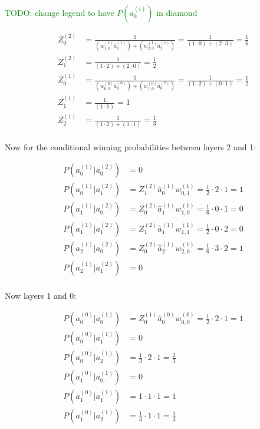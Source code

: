 \documentclass[A4paper,draft]{scrreprt}
\newcommand{\neuron}[2]{a_{#2}^{(#1)}}
\newcommand{\neuronforward}[2]{\hat{a}_{#2}^{(#1)}}
\newcommand{\ebpscalar}[2]{Z_{#2}^{(#1)}}
\newcommand{\weight}[3]{w_{#2,#3}^{(#1)}}
\newcommand{\cwp}[4]{P\left(\neuron{#1}{#2} | \neuron{#3}{#4}\right)}
\begin{document}
\textcolor{green}{TODO: change legend to have $P(a_k^{(i)})$ in diamond}\newline

\begin{align*}
\ebpscalar{2}{0} &=
  \frac{1}{\left(\weight{1}{1}{0}\neuronforward{1}{1}\right) +
  \left(\weight{1}{2}{0} \neuronforward{1}{2}\right)}
  = \frac{1}{(1 \cdot 0) + (2 \cdot 3)}
  = \frac{1}{6}
  \\
\ebpscalar{2}{1} &= \frac{1}{(1\cdot 2) + (2 \cdot 0)} = \frac{1}{2}\\
\ebpscalar{1}{0} &= \frac{1}{
  \left(\weight{0}{0}{0} \neuronforward{0}{0}\right) +
  \left(\weight{0}{1}{0} \neuronforward{0}{0}\right)}
  = \frac{1}{(1 \cdot 2) + (0 \cdot 1)}
  = \frac{1}{2}
  \\
\ebpscalar{1}{1} &= \frac{1}{(1 \cdot 1)} = 1\\
\ebpscalar{1}{2} &= \frac{1}{(1 \cdot 2) + (1 \cdot 1)} = \frac{1}{3}\\
\end{align*}

Now for the conditional winning probabilities between layers 2 and 1:

\begin{align*}
\cwp{1}{0}{2}{0} &= 0 \\
\cwp{1}{0}{2}{1} &= \ebpscalar{2}{1} \neuronforward{1}{0} \weight{1}{0}{1} =
  \frac{1}{2} \cdot 2 \cdot 1 = 1
  \\
\cwp{1}{1}{2}{0} &= \ebpscalar{2}{0} \neuronforward{1}{1} \weight{1}{1}{0} =
  \frac{1}{6} \cdot 0 \cdot 1 = 0
  \\
\cwp{1}{1}{2}{1} &= \ebpscalar{2}{1} \neuronforward{1}{1} \weight{1}{1}{1} =
  \frac{1}{2} \cdot 0 \cdot 2 = 0
  \\
\cwp{1}{2}{2}{0} &= \ebpscalar{2}{0} \neuronforward{1}{2} \weight{1}{2}{0} =
  \frac{1}{6} \cdot 3 \cdot 2 = 1
  \\
\cwp{1}{2}{2}{1} &= 0\\
\end{align*}

Now layers 1 and 0:

\begin{align*}
\cwp{0}{0}{1}{0} &= \ebpscalar{1}{0} \neuronforward{0}{0} \weight{0}{0}{0} =
  \frac{1}{2} \cdot 2 \cdot 1 = 1\\
\cwp{0}{0}{1}{1} &= 0 \\
\cwp{0}{0}{1}{2} &= \frac{1}{3} \cdot 2 \cdot 1 = \frac{2}{3} \\
\cwp{0}{1}{1}{0} &= 0 \\
\cwp{0}{1}{1}{1} &= 1 \cdot 1 \cdot 1 = 1 \\
\cwp{0}{1}{1}{2} &= \frac{1}{3} \cdot 1 \cdot 1 = \frac{1}{3} \\
\end{align*}
\end{document}
